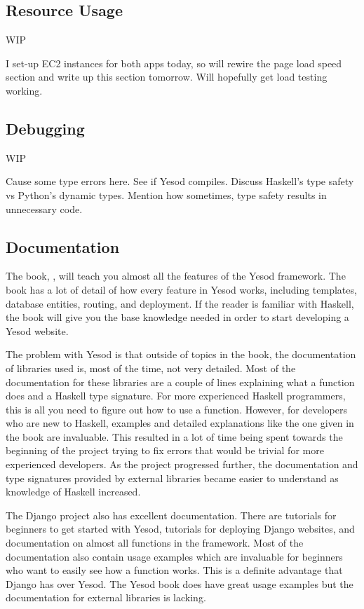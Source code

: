 \subsection{Resource Usage}
WIP

I set-up EC2 instances for both apps today, so will rewire the page load
speed section and write up this section tomorrow. Will hopefully get
load testing working.

\subsection{Debugging}
WIP

Cause some type errors here. See if Yesod compiles. Discuss Haskell's type safety
vs Python's dynamic types. Mention how sometimes, type safety results in
unnecessary code.

\subsection{Documentation}

The book, , will teach you almost all the features of the
Yesod framework. The book has a lot of detail of how every feature in Yesod works,
including templates, database entities, routing, and deployment. If the reader
is familiar with Haskell, the book will give you the base knowledge needed
in order to start developing a Yesod website.

The problem with Yesod is that outside of topics in the book, the documentation
of libraries used is, most of the time, not very detailed. Most of the documentation
for these libraries are a couple of lines explaining what a function does and
a Haskell type signature. For more experienced Haskell programmers, this is
all you need to figure out how to use a function. However, for developers who
are new to Haskell, examples and detailed explanations like the one given in
the book are invaluable. This resulted in a lot of time being spent towards the
beginning of the project trying to fix errors that would be trivial for more
experienced developers. As the project progressed further, the documentation
and type signatures provided by external libraries became easier to understand
as knowledge of Haskell increased.

The Django project also has excellent documentation. There are tutorials for
beginners to get started with Yesod, tutorials for deploying Django websites,
and documentation on almost all functions in the framework. Most of the
documentation also contain usage examples which are invaluable for
beginners who want to easily see how a function works. This is a definite
advantage that Django has over Yesod. The Yesod book does have great
usage examples but the documentation for external libraries is lacking.

